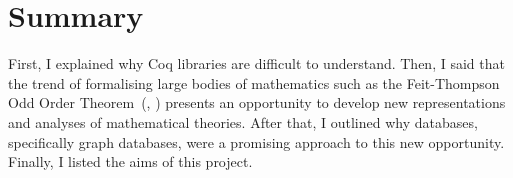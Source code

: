 \section{Summary}

First, I explained why Coq libraries are difficult to understand. Then, I said
that the trend of formalising large bodies of mathematics such as the
Feit-Thompson Odd Order Theorem~{(\citealt{peterfalvi2000oot}, \citealt{bender1994oot})}
presents an opportunity to develop new representations and analyses of
mathematical theories. After that, I outlined why databases, specifically
graph databases, were a promising approach to this new opportunity. Finally, I
listed the aims of this project.
